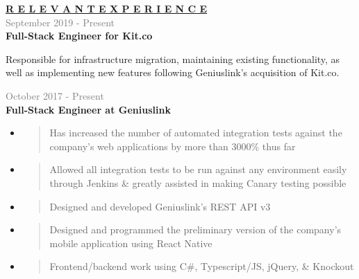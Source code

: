 \documentclass[letterpage]{article}
\begin{document}
\begin{minipage}[t]{0.61\linewidth}
\vspace{0pt}
\textbf{\fontsize{14px}{1px}\selectfont
  \ul{R E L E V A N T \:\: E X P E R I E N C E}
}\\

\vspace{7px}
\textcolor{gray}{September 2019 - Present}\\
\textbf{\textsf{Full-Stack Engineer for Kit.co}}\\
\raggedright
Responsible for infrastructure migration,
maintaining existing functionality, as well as implementing
new features following Geniuslink's acquisition of Kit.co.

\vspace{7px}
\textcolor{gray}{October 2017 - Present}\\
\textbf{\textsf{Full-Stack Engineer at Geniuslink}}
\begin{itemize}[leftmargin=*,labelindent=1mm,labelsep=0mm]
\item
  \begin{quote}
  \raggedright
  Has increased the number of automated integration tests
  against the company's web applications by more than 3000\% thus far
  \end{quote}
\item
  \begin{quote}
  \raggedright
  Allowed all integration tests to be run against any
  environment easily through Jenkins \& greatly
  assisted in making Canary testing possible
  \end{quote}
\item
  \begin{quote}
  \raggedright
  Designed and developed Geniuslink's REST API v3
  \end{quote}
\item
  \begin{quote}
  \raggedright
  Designed and programmed the preliminary version of the company's mobile
  application using React Native
  \end{quote}
\item
  \begin{quote}
  \raggedright
  Frontend/backend work using C\#, Typescript/JS,
  jQuery, \& Knockout
  \end{quote}
\end{itemize}


\end{minipage}
\end{document}
